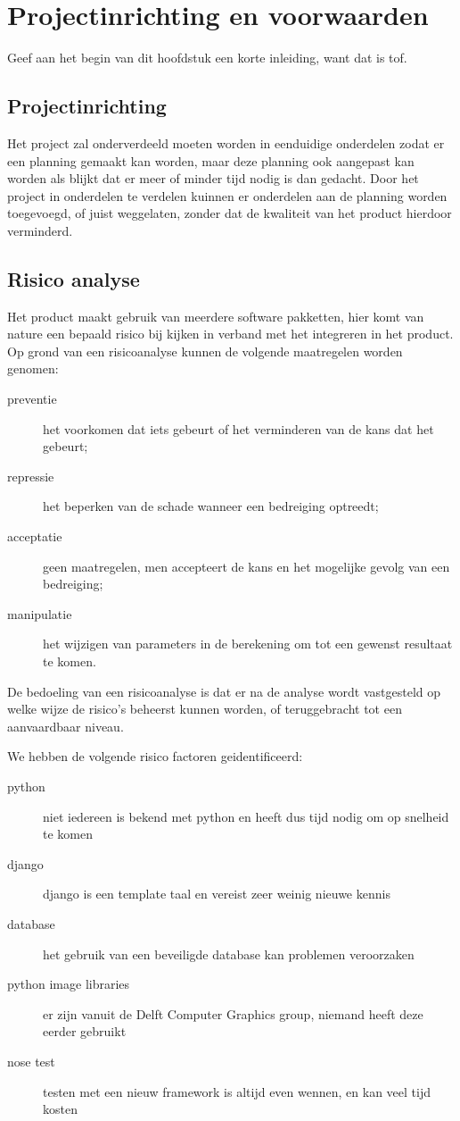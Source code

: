 \section{Projectinrichting en voorwaarden}
\label{projectinrichting}

Geef aan het begin van dit hoofdstuk een korte inleiding, want dat is tof. %

\subsection{Projectinrichting}

Het project zal onderverdeeld moeten worden in eenduidige onderdelen zodat er een planning gemaakt kan worden,
maar deze planning ook aangepast kan worden als blijkt dat er meer of minder tijd nodig is dan gedacht.
Door het project in onderdelen te verdelen kuinnen er onderdelen aan de planning worden toegevoegd,
of juist weggelaten, zonder dat de kwaliteit van het product hierdoor verminderd.

\subsection{Risico analyse}

Het product maakt gebruik van meerdere software pakketten,
hier komt van nature een bepaald risico bij kijken in verband met het integreren in het product.
Op grond van een risicoanalyse kunnen de volgende maatregelen worden genomen:
\begin{description}
    \item[preventie] het voorkomen dat iets gebeurt of het verminderen van de kans dat het gebeurt;
    \item[repressie] het beperken van de schade wanneer een bedreiging optreedt;
    \item[acceptatie] geen maatregelen, men accepteert de kans en het mogelijke gevolg van een bedreiging;
    \item[manipulatie] het wijzigen van parameters in de berekening om tot een gewenst resultaat te komen.
\end{description}

De bedoeling van een risicoanalyse is dat er na de analyse wordt vastgesteld op welke wijze de risico's beheerst kunnen worden, of teruggebracht tot een aanvaardbaar niveau. \cite{wiki:risico_analyse}

We hebben de volgende risico factoren geidentificeerd:
\begin{description}
    \item[python] niet iedereen is bekend met python en heeft dus tijd nodig om op snelheid te komen
    \item[django] django is een template taal en vereist zeer weinig nieuwe kennis
    \item[database] het gebruik van een beveiligde database kan problemen veroorzaken
    \item[python image libraries] er zijn vanuit de Delft Computer Graphics group, niemand heeft deze eerder gebruikt
    \item[nose test] testen met een nieuw framework is altijd even wennen, en kan veel tijd kosten
\end{description}

